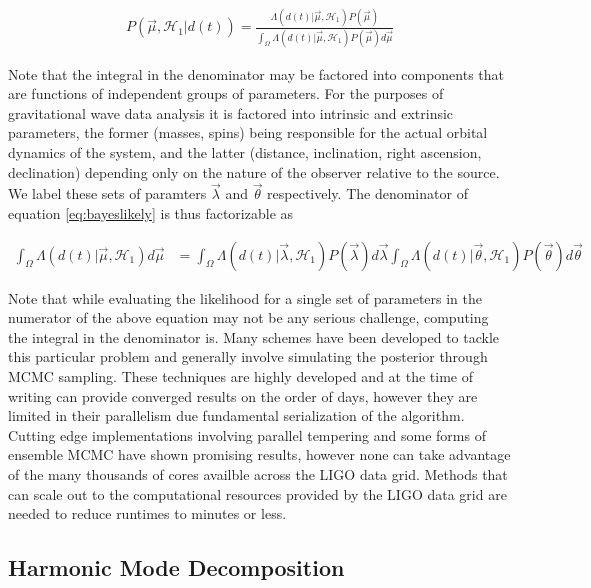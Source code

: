 \begin{align}\label{eq:bayeslikely}
P(\vec{\mu}, \mathcal{H}_1|d(t)) = \frac{\Lambda(d(t)|\vec{\mu}, \mathcal{H}_1)P(\vec{\mu})}{\int_{\Omega}\Lambda(d(t)|\vec{\mu}, \mathcal{H}_1)P(\vec{\mu})d\vec{\mu}}
\end{align}

Note that the integral in the denominator may be factored into components that are functions of independent groups of parameters. For the purposes of gravitational wave data analysis it is factored into intrinsic and extrinsic parameters, the former (masses, spins) being responsible for the actual orbital dynamics of the system, and the latter (distance, inclination, right ascension, declination) depending only on the nature of the observer relative to the source. We label these sets of paramters $\vec{\lambda}$ and $\vec{\theta}$ respectively. The denominator of equation \ref{eq:bayeslikely} is thus factorizable as 

\begin{align}\label{eq:sepparam}
\int_{\Omega}\Lambda(d(t)|\vec{\mu}, \mathcal{H}_1)d\vec{\mu} &= \int_{\Omega}\Lambda(d(t)|\vec{\lambda}, \mathcal{H}_1)P(\vec{\lambda})d\vec{\lambda}\int_{\Omega}\Lambda(d(t)|\vec{\theta}, \mathcal{H}_1)P(\vec{\theta})d\vec{\theta} 
\end{align} 

Note that while evaluating the likelihood for a single set of parameters in the numerator of the above equation may not be any serious challenge, computing the integral in the denominator is. Many schemes \cite{rapidpe} \cite{lalinference} \cite{mcmc} have been developed to tackle this particular problem and generally involve simulating the posterior through MCMC sampling. These techniques are highly developed and at the time of writing can provide converged results on the order of days, however they are limited in their parallelism due fundamental serialization of the algorithm. Cutting edge implementations involving parallel tempering and some forms of ensemble MCMC have shown promising results, however none can take advantage of the many thousands of cores availble across the LIGO data grid. Methods that can scale out to the computational resources provided by the LIGO data grid are needed to reduce runtimes to minutes or less.   

\subsection{Harmonic Mode Decomposition}

